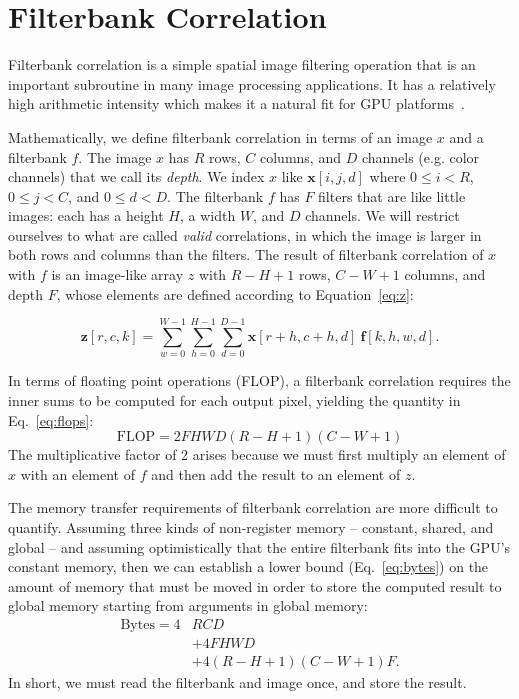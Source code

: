 \documentclass{sig-alternate}
\begin{document}
\section{Filterbank Correlation}

\label{sec:fbcorr}

Filterbank correlation is a simple spatial image filtering operation that is
an important subroutine in many image processing applications. It has a relatively
high arithmetic intensity which makes it a natural fit for GPU platforms~\citep{pinto+cox:2011gcg}.

Mathematically, we define filterbank correlation in terms of an
image $x$ and a filterbank $f$.
The image $x$ has $R$ rows, $C$ columns, and $D$ channels (e.g. color
channels) that we call its {\em depth}. We index $x$ like $\mathbf{x}[i,j,d]$
where $0 \leq i < R$, $0 \leq j < C$, and $0 \leq d < D$.
The filterbank $f$ has $F$ filters that are like little images: each has a
height $H$, a width $W$, and $D$ channels.
We will restrict ourselves to what are called {\em valid} correlations, in
which the image is larger in both rows and columns than the filters.
The result of filterbank correlation of $x$ with $f$ is an image-like array
$z$ with $R-H+1$ rows, $C-W+1$ columns, and depth $F$, whose elements are
defined according to Equation~\ref{eq:z}:

\begin{equation}
    \mathbf{z}[r,c,k] = \sum_{w=0}^{W-1} \sum_{h=0}^{H-1} \sum_{d=0}^{D-1}
        \mathbf{x}[r+h, c+h, d]~ \mathbf{f}[k, h, w, d].
        \label{eq:z}
\end{equation}

In terms of floating point operations (FLOP), a filterbank correlation requires the
inner sums to be computed for each output pixel, yielding the quantity in
Eq.~\ref{eq:flops}:
\begin{equation}
\mathrm{FLOP} = 2  F  H  W  D  (R - H + 1)( C- W + 1)
\label{eq:flops}
\end{equation}
The multiplicative factor of 2 arises because we must first multiply an element of
$x$ with an element of $f$ and then add the result to an element of $z$.

The memory transfer requirements of filterbank correlation are more difficult to quantify.
Assuming three kinds of non-register memory -- constant, shared, and global --
and assuming optimistically that the entire filterbank fits into the GPU's constant memory,
then we can establish a lower bound (Eq.~\ref{eq:bytes}) on the amount of
memory that must be moved in order to store the computed result to global
memory starting from arguments in global memory:
\begin{align}
\mathrm{Bytes} = 4&RCD \nonumber \\
& + 4FHWD \nonumber \\
& + 4(R-H+1)(C-W+1)F.
\label{eq:bytes}
\end{align}
In short, we must read the filterbank and image once, and store the result.
\end{document}
